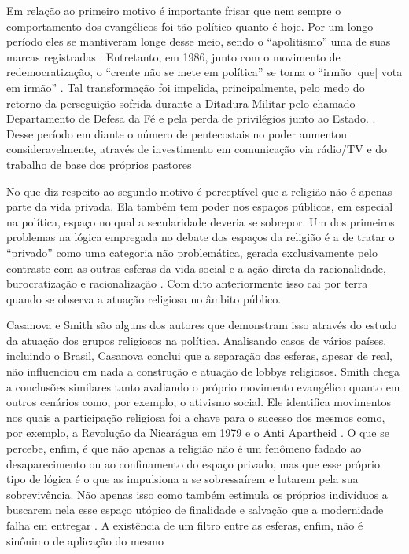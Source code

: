 \documentclass[
	12pt,				%
	oneside,			%
	a4paper,			%
	sumario=tradicional,
	english,			%
	brazil				%
	]{abntex2}
\begin{document}
Em relação ao primeiro motivo é importante frisar que nem sempre o comportamento dos evangélicos foi tão político quanto é hoje. Por um longo período eles se mantiveram longe desse meio, sendo o ``apolitismo'' uma de suas marcas registradas \autocites[250]{mariano_laicidade_2011-1}[02]{campos_os_2006}. Entretanto, em 1986, junto com o movimento de redemocratização, o ``crente não se mete em política'' se torna o ``irmão {[}que{]} vota em irmão'' \autocite[251]{mariano_laicidade_2011-1}. Tal transformação foi impelida, principalmente, pelo medo do retorno da perseguição sofrida durante a Ditadura Militar pelo chamado Departamento de Defesa da Fé e pela perda de privilégios junto ao Estado. \autocite[251]{mariano_laicidade_2011-1}. Desse período em diante o número de pentecostais no poder aumentou consideravelmente, através de investimento em comunicação via rádio/TV e do trabalho de base dos próprios pastores \autocite[129]{freston_pentecostalism_1995-1}

No que diz respeito ao segundo motivo é perceptível que a religião não é apenas parte da vida privada. Ela também tem poder nos espaços públicos, em especial na política, espaço no qual a secularidade deveria se sobrepor. Um dos primeiros problemas na lógica empregada no debate dos espaços da religião é a de tratar o ``privado'' como uma categoria não problemática, gerada exclusivamente pelo contraste com as outras esferas da vida social e a ação direta da racionalidade, burocratização e racionalização \autocite[716]{mariano_expansao_2016}. Com dito anteriormente isso cai por terra quando se observa a atuação religiosa no âmbito público.

Casanova \autocite*{casanova_public_1994-1} e Smith \autocite*{smith_disruptive_1996,smith_american_1998} são alguns dos autores que demonstram isso através do estudo da atuação dos grupos religiosos na política. Analisando casos de vários países, incluindo o Brasil, Casanova \autocite*{casanova_public_1994-1} conclui que a separação das esferas, apesar de real, não influenciou em nada a construção e atuação de lobbys religiosos. Smith chega a conclusões similares tanto avaliando o próprio movimento evangélico \autocite{smith_american_1998} quanto em outros cenários como, por exemplo, o ativismo social. Ele identifica movimentos nos quais a participação religiosa foi a chave para o sucesso dos mesmos como, por exemplo, a Revolução da Nicarágua em 1979 e o Anti Apartheid \autocite[02]{smith_disruptive_1996}. O que se percebe, enfim, é que não apenas a religião não é um fenômeno fadado ao desaparecimento ou ao confinamento do espaço privado, mas que esse próprio tipo de lógica é o que as impulsiona a se sobressaírem e lutarem pela sua sobrevivência. Não apenas isso como também estimula os próprios indivíduos a buscarem nela esse espaço utópico de finalidade e salvação que a modernidade falha em entregar \autocite[16]{miranda_religiao_1995}. A existência de um filtro entre as esferas, enfim, não é sinônimo de aplicação do mesmo \autocite[25]{butler_political_2011}
\end{document}
